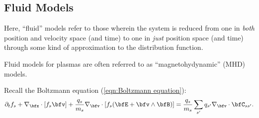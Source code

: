 \subsection{Fluid Models}\label{cha:fluid models}
    \line

    \begin{definition}
        Here, ``fluid'' models refer to those wherein the system is reduced from one in \emph{both} position and velocity space (and time) to one in \emph{just} position space (and time) through some kind of approximation to the distribution function.
    \end{definition}

    Fluid models for plasmas are often referred to as ``magnetohydynamic'' (MHD) models.

    \line
    
    Recall the Boltzmann equation (\ref{eqn:Boltzmann equation}):
    \begin{equation*}
        \partial_{t}f_{s} + \nabla_{\bfx}\cdot[f_{s}\bfv] + \frac{q_{s}}{m_{s}}\nabla_{\bfv}\cdot[f_{s}(\bfE + \bfv\wedge\bfB)]  =  \frac{q_{s}}{m_{s}}\sum_{s'}q_{s'}\nabla_{\bfv}\cdot\bfC_{ss'}.
    \end{equation*}


    
    
    
    
    
